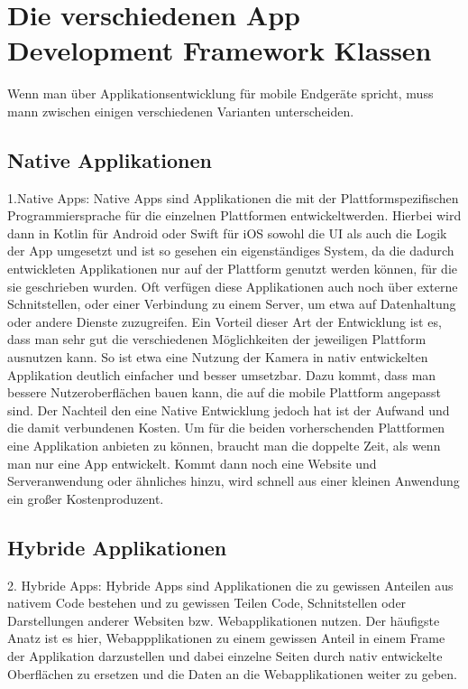 \section{Die verschiedenen App Development Framework Klassen}
Wenn man über Applikationsentwicklung für mobile Endgeräte spricht, muss mann zwischen einigen verschiedenen Varianten unterscheiden.
\subsection{Native Applikationen}
1.Native Apps:
Native Apps sind Applikationen die mit der Plattformspezifischen Programmiersprache für die einzelnen Plattformen entwickeltwerden. Hierbei wird dann in Kotlin für Android oder Swift für iOS sowohl die UI als auch die Logik der App umgesetzt und ist so gesehen ein eigenständiges System, da die dadurch entwickleten Applikationen nur auf der Plattform genutzt werden können, für die sie geschrieben wurden.
Oft verfügen diese Applikationen auch noch über externe Schnitstellen, oder einer Verbindung zu einem Server, um etwa auf Datenhaltung oder andere Dienste zuzugreifen.
Ein Vorteil dieser Art der Entwicklung ist es, dass man sehr gut die verschiedenen Möglichkeiten der jeweiligen Plattform ausnutzen kann. So ist etwa eine Nutzung der Kamera in nativ entwickelten Applikation deutlich einfacher und besser umsetzbar. Dazu kommt, dass man bessere Nutzeroberflächen bauen kann, die auf die mobile Plattform angepasst sind.
Der Nachteil den eine Native Entwicklung jedoch hat ist der Aufwand und die damit verbundenen Kosten. Um für die beiden vorherschenden Plattformen eine Applikation anbieten zu können, braucht man die doppelte Zeit, als wenn man nur eine App entwickelt. Kommt dann noch eine Website und Serveranwendung oder ähnliches hinzu, wird schnell aus einer kleinen Anwendung ein großer Kostenproduzent.
\subsection{Hybride Applikationen}
2. Hybride Apps:
Hybride Apps sind Applikationen die zu gewissen Anteilen aus nativem Code bestehen und zu gewissen Teilen Code, Schnitstellen oder Darstellungen anderer Websiten bzw. Webapplikationen nutzen. Der häufigste Anatz ist es hier, Webappplikationen zu einem gewissen Anteil in einem Frame der Applikation darzustellen und dabei einzelne Seiten durch nativ entwickelte Oberflächen zu ersetzen und die Daten an die Webapplikationen weiter zu geben. 

